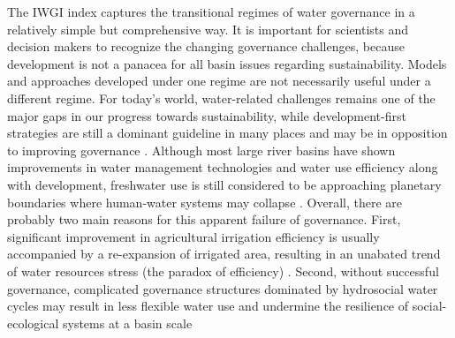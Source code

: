 The IWGI index captures the transitional regimes of water governance in a relatively simple but comprehensive way.
It is important for scientists and decision makers to recognize the changing governance challenges, because development is not a panacea for all basin issues regarding sustainability. %
Models and approaches developed under one regime are not necessarily useful under a different regime.
For today's world, water-related challenges remains one of the major gaps in our progress towards sustainability, while development-first strategies are still a dominant guideline in many places and may be in opposition to improving governance
\cite{xuAssessingprogresssustainable2020,liuAerosolweakenedsummermonsoons2017,greveGlobalassessmentwater2018}.
Although most large river basins have shown improvements in water management technologies and water use efficiency along with development, freshwater use is still considered to be approaching planetary boundaries where human-water systems may collapse
\cite{anExploringeffectsGrain2017,degraafEnvironmentalflowlimits2019,hugginssocialecologicaldimensionschanging2020}.
Overall, there are probably two main reasons for this apparent failure of governance.
First, significant improvement in agricultural irrigation efficiency is usually accompanied by a re-expansion of irrigated area, resulting in an unabated trend of water resources stress (the paradox of efficiency)
\cite{graftonparadoxirrigationefficiency2018}.
Second, without successful governance, complicated governance structures dominated by hydrosocial water cycles may result in less flexible water use and undermine the resilience of social-ecological systems at a basin scale
